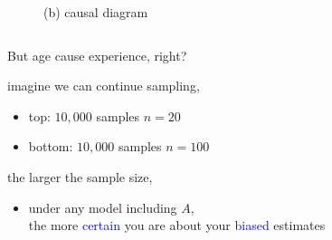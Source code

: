 \begin{frame}
\begin{columns}
\begin{column}{0.5\textwidth}
\begin{figure}
				\caption*{(b) causal diagram}
			\end{figure}
		\end{column}
	\end{columns}
\end{frame}
%
%
\begin{lhframe}[rhgraphic={\texttt{[image: descendant1b\_samplesize.pdf]}}]
	{But age cause experience, right?}
	
	imagine we can continue sampling,
	\begin{itemize}
		\item top: $10,000$ samples $n=20$
		\item bottom: $10,000$ samples $n=100$
	\end{itemize}
	
	the larger the sample size,
	\begin{itemize}
		\item under any model including $A$, \\
		the more \textcolor{blue}{certain} you are about your \textcolor{blue}{biased} estimates
	\end{itemize}
\end{lhframe}
%
%

